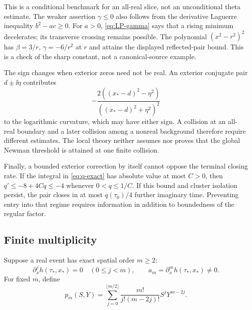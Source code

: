 This is a conditional benchmark for an all-real slice, not an
unconditional theta estimate. The weaker assertion \(\gamma\le0\)
also follows from the derivative Laguerre inequality \(b^2-ac\ge0\).
For \(a>0\), \eqref{eq:LP-gamma} says that a rising minimum
decelerates; its transverse crossing remains possible. The polynomial
\((x^2-r^2)^2\) has \(\beta=3/r\), \(\gamma=-6/r^2\) at \(r\)
and attains the displayed reflected-pair bound. This is a check of
the sharp constant, not a canonical-source example.

The sign changes when exterior zeros need not be real. An exterior
conjugate pair \(d\pm\ii\eta\) contributes
\begin{equation}\label{eq:complex-exterior-curvature}
 -\frac{2((x_*-d)^2-\eta^2)}{((x_*-d)^2+\eta^2)^2}
\end{equation}
to the logarithmic curvature, which may have either sign. A collision
at an all-real boundary and a later collision among a nonreal
background therefore require different estimates. The local theory
neither assumes nor proves that the global Newman threshold is
attained at one finite collision.

Finally, a bounded exterior correction by itself cannot oppose the
terminal closing rate. If the integral in \eqref{eq:q-exact} has
absolute value at most \(C>0\), then
\(q'\le-8+4Cq\le-4\) whenever \(0<q\le1/C\).
If this bound and cluster isolation persist, the pair closes in
at most \(q(\tau_0)/4\) further imaginary time. Preventing entry
into that regime requires information in addition to boundedness
of the regular factor.

\subsection{Finite multiplicity}
\label{sec:multiplicity}


Suppose a real event has exact spatial order \(m\geq2\):
\[
 \partial_x^jh(\tau_*,x_*)=0\quad(0\leq j<m),\qquad
 a_m=\partial_x^mh(\tau_*,x_*)\ne0.
\]
For fixed \(m\), define
\begin{equation}\label{eq:heat-poly}
 p_m(S,Y)=
 \sum_{j=0}^{\lfloor m/2\rfloor}
 \frac{m!}{j!(m-2j)!}S^jY^{m-2j}.
\end{equation}

